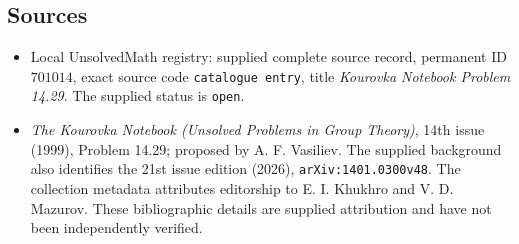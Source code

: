 \documentclass[11pt]{article}
\begin{document}
\subsection{Sources}
\begin{itemize}
\item Local UnsolvedMath registry: supplied complete source record, permanent ID \(701014\), exact source code \texttt{catalogue entry}, title \emph{Kourovka Notebook Problem 14.29}. The supplied status is \texttt{open}.
\item \emph{The Kourovka Notebook (Unsolved Problems in Group Theory)}, 14th issue (1999), Problem 14.29; proposed by A. F. Vasiliev. The supplied background also identifies the 21st issue edition (2026), \texttt{arXiv:1401.0300v48}. The collection metadata attributes editorship to E. I. Khukhro and V. D. Mazurov. These bibliographic details are supplied attribution and have not been independently verified.
\end{itemize}
\end{document}
